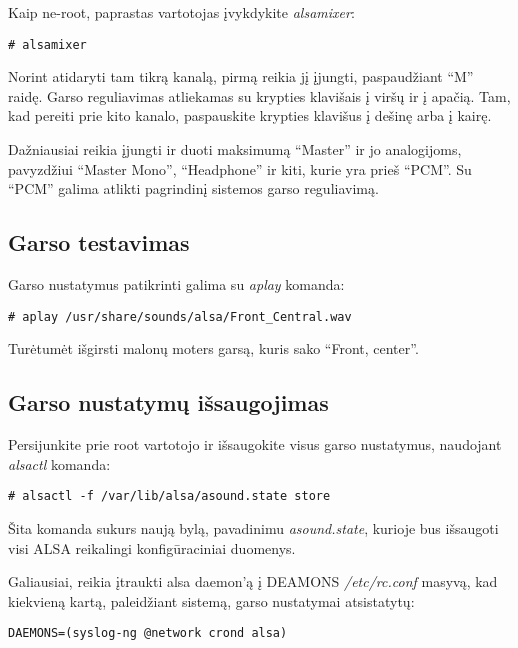   Kaip ne-root, paprastas vartotojas įvykdykite \textsl{alsamixer}:

  \begin{verbatim}
# alsamixer
  \end{verbatim}

  Norint atidaryti tam tikrą kanalą, pirmą reikia jį įjungti,
  paspaudžiant ``M'' raidę. Garso reguliavimas atliekamas su krypties
  klavišais į viršų ir į apačią. Tam, kad pereiti prie kito kanalo,
  paspauskite krypties klavišus į dešinę arba į kairę.

  Dažniausiai reikia įjungti ir duoti maksimumą ``Master'' ir jo
  analogijoms, pavyzdžiui ``Master Mono'', ``Headphone'' ir kiti,
  kurie yra prieš ``PCM''. Su ``PCM'' galima atlikti pagrindinį
  sistemos garso reguliavimą.

    \subsection{Garso testavimas}

      Garso nustatymus patikrinti galima su \textsl{aplay} komanda:

      \begin{verbatim}
# aplay /usr/share/sounds/alsa/Front_Central.wav
      \end{verbatim}

      Turėtumėt išgirsti malonų moters garsą, kuris sako ``Front,
      center''.

    \subsection{Garso nustatymų išsaugojimas}

      Persijunkite prie root vartotojo ir išsaugokite visus garso
      nustatymus, naudojant \textsl{alsactl} komanda:

      \begin{verbatim}
# alsactl -f /var/lib/alsa/asound.state store
      \end{verbatim}

      Šita komanda sukurs naują bylą, pavadinimu
      \textsl{asound.state}, kurioje bus išsaugoti visi ALSA
      reikalingi konfigūraciniai duomenys.

      Galiausiai, reikia įtraukti alsa daemon'ą į DEAMONS
      \textsl{/etc/rc.conf} masyvą, kad kiekvieną kartą, paleidžiant
      sistemą, garso nustatymai atsistatytų:

      \begin{verbatim}
DAEMONS=(syslog-ng @network crond alsa)
      \end{verbatim}
